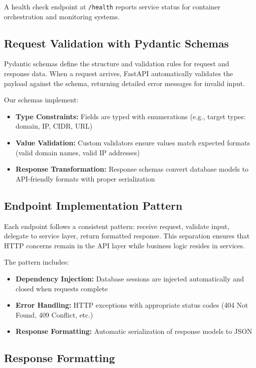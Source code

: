 \documentclass[a4paper,12pt]{report}
\begin{document}
A health check endpoint at \texttt{/health} reports service status for container orchestration and monitoring systems.\hfill \break

\subsection{Request Validation with Pydantic Schemas}

Pydantic schemas define the structure and validation rules for request and response data. When a request arrives, FastAPI automatically validates the payload against the schema, returning detailed error messages for invalid input.\hfill \break

Our schemas implement:
\begin{itemize}
\item \textbf{Type Constraints:} Fields are typed with enumerations (e.g., target types: domain, IP, CIDR, URL)
\item \textbf{Value Validation:} Custom validators ensure values match expected formats (valid domain names, valid IP addresses)
\item \textbf{Response Transformation:} Response schemas convert database models to API-friendly formats with proper serialization
\end{itemize}

\subsection{Endpoint Implementation Pattern}

Each endpoint follows a consistent pattern: receive request, validate input, delegate to service layer, return formatted response. This separation ensures that HTTP concerns remain in the API layer while business logic resides in services.\hfill \break

The pattern includes:
\begin{itemize}
\item \textbf{Dependency Injection:} Database sessions are injected automatically and closed when requests complete
\item \textbf{Error Handling:} HTTP exceptions with appropriate status codes (404 Not Found, 409 Conflict, etc.)
\item \textbf{Response Formatting:} Automatic serialization of response models to JSON
\end{itemize}

\subsection{Response Formatting}
\end{document}
